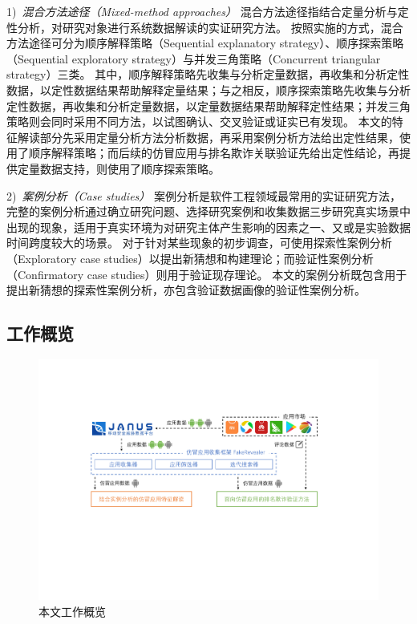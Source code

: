 1)\ \emph{混合方法途径（Mixed-method approaches）} \quad
混合方法途径指结合定量分析与定性分析，对研究对象进行系统数据解读的实证研究方法。
按照实施的方式，混合方法途径可分为顺序解释策略（Sequential explanatory strategy）、顺序探索策略（Sequential exploratory strategy）与并发三角策略（Concurrent triangular strategy）三类。
其中，顺序解释策略先收集与分析定量数据，再收集和分析定性数据，以定性数据结果帮助解释定量结果；与之相反，顺序探索策略先收集与分析定性数据，再收集和分析定量数据，以定量数据结果帮助解释定性结果；并发三角策略则会同时采用不同方法，以试图确认、交叉验证或证实已有发现。
本文的特征解读部分先采用定量分析方法分析数据，再采用案例分析方法给出定性结果，使用了顺序解释策略；而后续的仿冒应用与排名欺诈关联验证先给出定性结论，再提供定量数据支持，则使用了顺序探索策略。

2)\ \emph{案例分析（Case studies）} \quad
案例分析是软件工程领域最常用的实证研究方法，完整的案例分析通过确立研究问题、选择研究案例和收集数据三步研究真实场景中出现的现象，适用于真实环境为对研究主体产生影响的因素之一、又或是实验数据时间跨度较大的场景。
对于针对某些现象的初步调查，可使用探索性案例分析（Exploratory case studies）以提出新猜想和构建理论；而验证性案例分析（Confirmatory case studies）则用于验证现存理论。
本文的案例分析既包含用于提出新猜想的探索性案例分析，亦包含验证数据画像的验证性案例分析。

\subsection{工作概览}

\begin{figure}[htbp]
	\centering
	\includegraphics[width=\textwidth]{./Figures/edwin-overview}
	\caption{本文工作概览}
	\label{fig:Workflow}
	\vspace{-3mm}
\end{figure}


